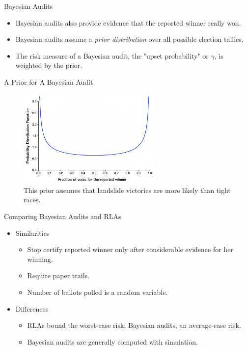 \documentclass{beamer}
\begin{document}
\begin{frame}{Bayesian Audits}
\begin{itemize}
    \item Bayesian audits also provide evidence that the reported winner really won.
    \vskip 1cm
    \item Bayesian audits assume a \emph{prior distribution} over all possible election tallies.
    \vskip 1cm
    \item The risk measure of a Bayesian audit, the "upset probability" or $\gamma$, is weighted by the prior.
\end{itemize}
\end{frame}
\begin{frame}{A Prior for A Bayesian Audit}
\begin{figure}
    \centering
    \includegraphics[width=200pt]{Beta_Prior.png}
    \caption{This prior assumes that landslide victories are more likely than tight races.}
    \label{fig:my_label}
\end{figure}
\end{frame}

\begin{frame}{Comparing Bayesian Audits and RLAs}
\begin{itemize}
    \item Similarities
    \begin{itemize}
        \item Stop certify reported winner only after considerable evidence for her winning.
        \item Require paper trails.
        \item Number of ballots polled is a random variable.
    \end{itemize}
    \vskip 1cm
    \item Differences
    \begin{itemize}
        \item RLAs bound the worst-case risk; Bayesian audits, an average-case risk.
        \item Bayesian audits are generally computed with simulation.
    \end{itemize}
\end{itemize}
\end{frame}
\end{document}
